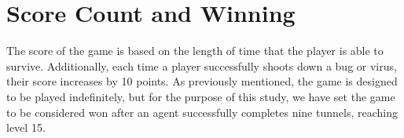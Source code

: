\section{Score Count and Winning}
The score of the game is based on the length of time that the player is able to survive. Additionally, each time a player successfully shoots down a bug or virus, their score increases by 10 points. As previously mentioned, the game is designed to be played indefinitely, but for the purpose of this study, we have set the game to be considered won after an agent successfully completes nine tunnels, reaching level 15.
